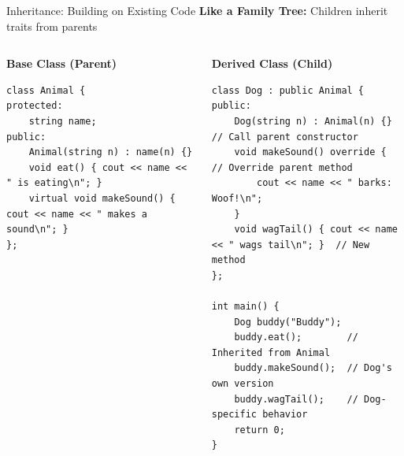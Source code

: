 \begin{frame}[fragile]{ Inheritance: Building on Existing Code}
    \textbf{Like a Family Tree:} Children inherit traits from parents

    \begin{columns}
        \begin{column}{0.3\textwidth}
            \textbf{Base Class (Parent)}
    \begin{verbatim}
class Animal {
protected:
    string name;
public:
    Animal(string n) : name(n) {}
    void eat() { cout << name << " is eating\n"; }
    virtual void makeSound() { cout << name << " makes a sound\n"; }
};
    \end{verbatim}
        \end{column}
        \begin{column}{0.7\textwidth}
            \textbf{Derived Class (Child)}
    \begin{verbatim}
class Dog : public Animal {
public:
    Dog(string n) : Animal(n) {}  // Call parent constructor
    void makeSound() override {        // Override parent method
        cout << name << " barks: Woof!\n";
    }
    void wagTail() { cout << name << " wags tail\n"; }  // New method
};

int main() {
    Dog buddy("Buddy");
    buddy.eat();        // Inherited from Animal
    buddy.makeSound();  // Dog's own version
    buddy.wagTail();    // Dog-specific behavior
    return 0;
}
    \end{verbatim}
        \end{column}
    \end{columns}
\end{frame}

